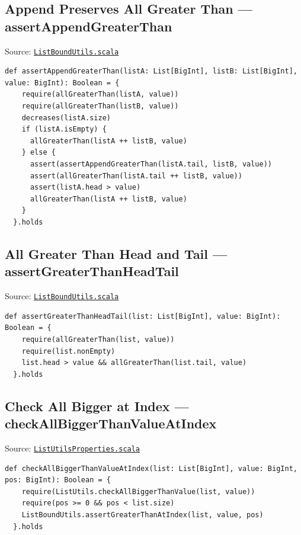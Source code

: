 \subsection{Append Preserves All Greater Than --- assertAppendGreaterThan}

Source:
\href{https://github.com/thiagomata/prime-numbers/blob/list-article-v1.0.0/src/main/scala/v1/chapter3/list/ListBoundUtils.scala}{\texttt{ListBoundUtils.scala}}

\begin{lstlisting}[style=scala]
  def assertAppendGreaterThan(listA: List[BigInt], listB: List[BigInt], value: BigInt): Boolean = {
    require(allGreaterThan(listA, value))
    require(allGreaterThan(listB, value))
    decreases(listA.size)
    if (listA.isEmpty) {
      allGreaterThan(listA ++ listB, value)
    } else {
      assert(assertAppendGreaterThan(listA.tail, listB, value))
      assert(allGreaterThan(listA.tail ++ listB, value))
      assert(listA.head > value)
      allGreaterThan(listA ++ listB, value)
    }
  }.holds
\end{lstlisting}

\subsection{All Greater Than Head and Tail --- assertGreaterThanHeadTail}

Source:
\href{https://github.com/thiagomata/prime-numbers/blob/list-article-v1.0.0/src/main/scala/v1/chapter3/list/ListBoundUtils.scala}{\texttt{ListBoundUtils.scala}}

\begin{lstlisting}[style=scala]
  def assertGreaterThanHeadTail(list: List[BigInt], value: BigInt): Boolean = {
    require(allGreaterThan(list, value))
    require(list.nonEmpty)
    list.head > value && allGreaterThan(list.tail, value)
  }.holds
\end{lstlisting}

\subsection{Check All Bigger at Index --- checkAllBiggerThanValueAtIndex}

Source:
\href{https://github.com/thiagomata/prime-numbers/blob/list-article-v1.0.0/src/main/scala/v1/chapter3/list/properties/ListUtilsProperties.scala}{\texttt{ListUtilsProperties.scala}}

\begin{lstlisting}[style=scala]
  def checkAllBiggerThanValueAtIndex(list: List[BigInt], value: BigInt, pos: BigInt): Boolean = {
    require(ListUtils.checkAllBiggerThanValue(list, value))
    require(pos >= 0 && pos < list.size)
    ListBoundUtils.assertGreaterThanAtIndex(list, value, pos)
  }.holds
\end{lstlisting}

